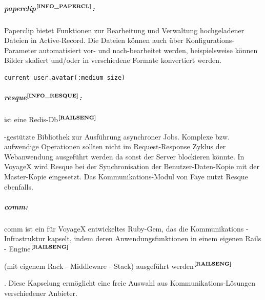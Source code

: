 \subparagraph{paperclip$^{\textbf{\ref{INFO_PAPERCL}}}$:}%
\addtocounter{footnote}{1}%
Paperclip bietet Funktionen zur Bearbeitung und Verwaltung hochgeladener Dateien in Active-Record. Die Dateien können auch über Konfigurations-Parameter automatisiert vor- und nach-bearbeitet werden, beispielsweise können Bilder skaliert und/oder in verschiedene Formate konvertiert werden.
\begin{lstlisting}[frame=single,xleftmargin=0pt,numbers=none]
  current_user.avatar(:medium_size)
\end{lstlisting}
\subparagraph{resque$^{\textbf{\ref{INFO_RESQUE}}}$:}%
\addtocounter{footnote}{1}%
ist eine Redis-Db$^{\textbf{\ref{RAILSENG}}}$%
\addtocounter{footnote}{1}%
%
-gestützte Bibliothek zur Ausführung asynchroner Jobs. Komplexe bzw. aufwendige Operationen sollten nicht im Request-Response Zyklus der Webanwendung ausgeführt werden da sonst
der Server blockieren könnte. In VoyageX wird Resque bei der Synchronisation der Benutzer-Daten-Kopie mit der Master-Kopie eingesetzt. Das Kommunikations-Modul von Faye nutzt Resque ebenfalls.
\subparagraph{comm:}comm ist ein für VoyageX entwickeltes Ruby-Gem, das die Kommunikations - Infrastruktur kapselt, indem deren Anwendungsfunktionen in einem eigenen Rails - Engine$^{\textbf{\ref{RAILSENG}}}$%
\addtocounter{footnote}{1}%
(mit eigenem Rack - Middleware - Stack) ausgeführt werden$^{\textbf{\ref{RAILSENG}}}$%
\addtocounter{footnote}{1}%
.
Diese Kapselung ermöglicht eine freie Auswahl aus Kommunikations-Lösungen verschiedener Anbieter.\\
